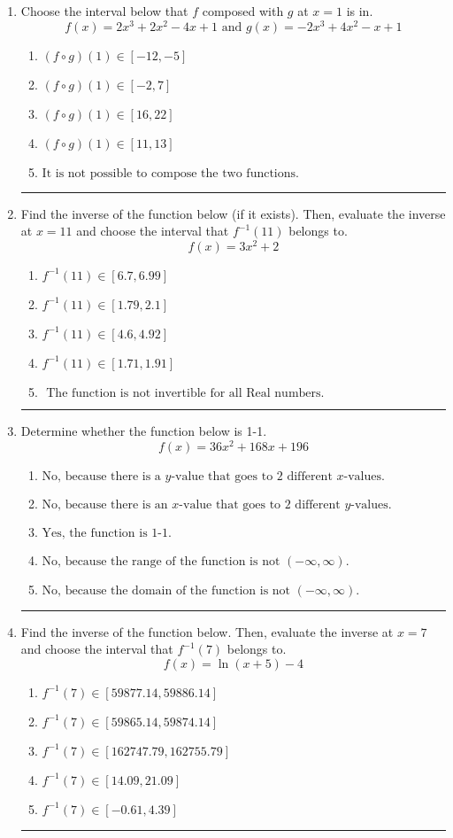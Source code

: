 \documentclass[14pt]{extbook}
\newcommand{\litem}[1]{\item#1\hspace*{-1cm}\rule{\textwidth}{0.4pt}}
\begin{document}
\begin{enumerate}
{\begin{enumerate}[label=\Alph*.]
\end{enumerate} }
\litem{
Choose the interval below that $f$ composed with $g$ at $x=1$ is in.\[ f(x) = 2x^{3} +2 x^{2} -4 x + 1 \text{ and } g(x) = -2x^{3} +4 x^{2} -x + 1 \]\begin{enumerate}[label=\Alph*.]
\item \( (f \circ g)(1) \in [-12, -5] \)
\item \( (f \circ g)(1) \in [-2, 7] \)
\item \( (f \circ g)(1) \in [16, 22] \)
\item \( (f \circ g)(1) \in [11, 13] \)
\item \( \text{It is not possible to compose the two functions.} \)

\end{enumerate} }
\litem{
Find the inverse of the function below (if it exists). Then, evaluate the inverse at $x = 11$ and choose the interval that $f^{-1}(11)$ belongs to.\[ f(x) = 3 x^2 + 2 \]\begin{enumerate}[label=\Alph*.]
\item \( f^{-1}(11) \in [6.7, 6.99] \)
\item \( f^{-1}(11) \in [1.79, 2.1] \)
\item \( f^{-1}(11) \in [4.6, 4.92] \)
\item \( f^{-1}(11) \in [1.71, 1.91] \)
\item \( \text{ The function is not invertible for all Real numbers. } \)

\end{enumerate} }
\litem{
Determine whether the function below is 1-1.\[ f(x) = 36 x^2 + 168 x + 196 \]\begin{enumerate}[label=\Alph*.]
\item \( \text{No, because there is a $y$-value that goes to 2 different $x$-values.} \)
\item \( \text{No, because there is an $x$-value that goes to 2 different $y$-values.} \)
\item \( \text{Yes, the function is 1-1.} \)
\item \( \text{No, because the range of the function is not $(-\infty, \infty)$.} \)
\item \( \text{No, because the domain of the function is not $(-\infty, \infty)$.} \)

\end{enumerate} }
\litem{
Find the inverse of the function below. Then, evaluate the inverse at $x = 7$ and choose the interval that $f^{-1}(7)$ belongs to.\[ f(x) = \ln{(x+5)}-4 \]\begin{enumerate}[label=\Alph*.]
\item \( f^{-1}(7) \in [59877.14, 59886.14] \)
\item \( f^{-1}(7) \in [59865.14, 59874.14] \)
\item \( f^{-1}(7) \in [162747.79, 162755.79] \)
\item \( f^{-1}(7) \in [14.09, 21.09] \)
\item \( f^{-1}(7) \in [-0.61, 4.39] \)

\end{enumerate} }
\end{enumerate}
\end{document}
